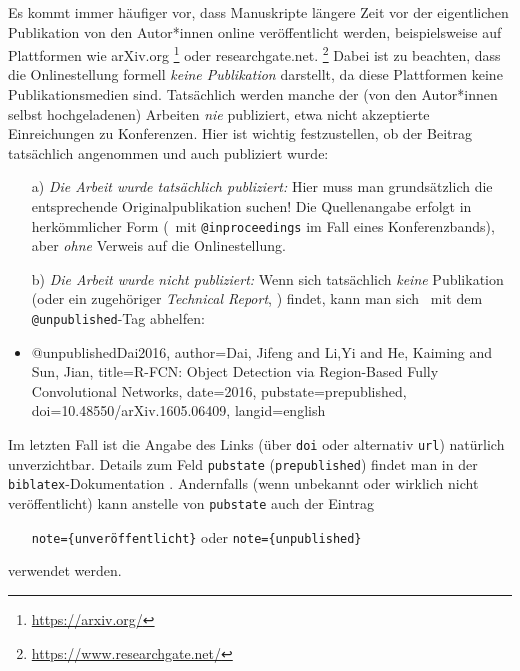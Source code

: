 Es kommt immer häufiger vor, dass Manuskripte längere Zeit vor der
eigentlichen Pub\-likation von den Autor*innen online veröffentlicht werden,
beispielsweise auf Plattformen wie \textsf{arXiv.org}%
\footnote{\url{https://arxiv.org/}}
oder \textsf{researchgate.net}.%
\footnote{\url{https://www.researchgate.net/}}
Dabei ist zu beachten, dass die Onlinestellung formell \emph{keine
Publikation} darstellt, da diese Plattformen keine Publikationsmedien sind.
Tatsächlich werden manche der (von den Autor*innen selbst hochgeladenen)
Arbeiten \emph{nie} publiziert, etwa nicht akzeptierte Einreichungen zu
Konferenzen. Hier ist wichtig festzustellen, ob der Beitrag tatsächlich
angenommen und auch publiziert wurde:
%
\begin{itemize}
\item[a)]
\emph{Die Arbeit wurde tatsächlich publiziert:} Hier muss man grundsätzlich
die entsprechende Original\-publikation suchen! Die Quellenangabe erfolgt in
herkömmlicher Form (\zB\ mit \texttt{@inproceedings} im Fall eines
Konferenzbands), aber \emph{ohne} Verweis auf die Onlinestellung.
\item[b)]
\emph{Die Arbeit wurde \emph{nicht} publiziert:} Wenn sich tatsächlich
\emph{keine} Publikation (oder ein zugehöriger \emph{Technical Report}, \so)
findet, kann man sich \evtl\ mit dem \texttt{@unpublished}-Tag abhelfen:
\item %
\begin{GenericCode}[numbers=none]
@unpublished{Dai2016,
  author={Dai, Jifeng and Li,Yi and He, Kaiming and Sun, Jian},
  title={{R-FCN:} Object Detection via Region-Based Fully Convolutional Networks},
  date={2016},
  pubstate={prepublished},
  doi={10.48550/arXiv.1605.06409},
  langid={english}
}
\end{GenericCode}
\begin{itemize}
\item[\cite{Dai2016}] 
\end{itemize}
\end{itemize}
%
Im letzten Fall ist die Angabe des Links (über \texttt{doi} oder alternativ
\texttt{url}) natürlich unverzichtbar. Details zum Feld \texttt{pubstate}
(\texttt{prepublished}) findet man in der \texttt{biblatex}-Dokumentation
\cite[Abschn.\ 4.9.2.11]{Kime2023}. Andernfalls (wenn unbekannt oder wirklich
nicht veröffentlicht) kann anstelle von \texttt{pubstate} auch der Eintrag
%
\begin{itemize}
\item[]\texttt{note=\{unveröffentlicht\}} \quad oder
   \quad \texttt{note=\{unpublished\}}
\end{itemize}
%
verwendet werden.


